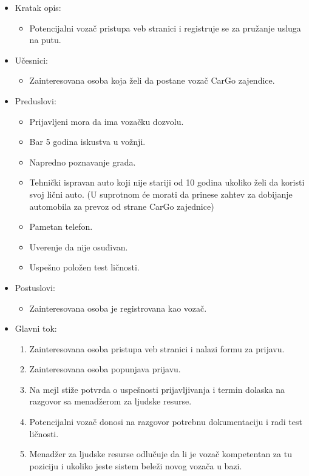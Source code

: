 \begin{itemize}
	\item Kratak opis:
		\begin{itemize}
			\item Potencijalni vozač pristupa veb stranici i registruje se za pružanje usluga na putu.
		\end{itemize}
	\item Učesnici:
		\begin{itemize}
			\item Zainteresovana osoba koja želi da postane vozač CarGo zajendice.
		\end{itemize}				
	\item Preduslovi:
		\begin{itemize}
		    \item Prijavljeni mora da ima vozačku dozvolu.
		    \item Bar 5 godina iskustva u vožnji.
		    \item Napredno poznavanje grada.
		    \item Tehnički ispravan auto koji nije stariji od 10 godina ukoliko želi da koristi svoj lični auto. (U suprotnom će morati da prinese zahtev za dobijanje automobila za prevoz od strane CarGo zajednice)
		    \item Pametan telefon.
		    \item Uverenje da nije osuđivan.
		    \item Uspešno položen test ličnosti.
		\end{itemize}
	\item Postuslovi:
		\begin{itemize}
			\item Zainteresovana osoba je registrovana kao vozač.
		\end{itemize}		
	\item Glavni tok:
		\begin{enumerate}
		    \item Zainteresovana osoba pristupa veb stranici i nalazi formu za prijavu.
		    \item Zainteresovana osoba popunjava prijavu.
		    \item Na mejl stiže potvrda o uspešnosti prijavljivanja i termin dolaska na razgovor sa menadžerom za ljudske resurse.
		    \item Potencijalni vozač donosi na razgovor potrebnu dokumentaciju i radi test ličnosti.
		    \item Menadžer za ljudske resurse odlučuje da li je vozač kompetentan za tu poziciju i ukoliko jeste sistem beleži novog vozača u bazi.

\end{enumerate}
\end{itemize}
